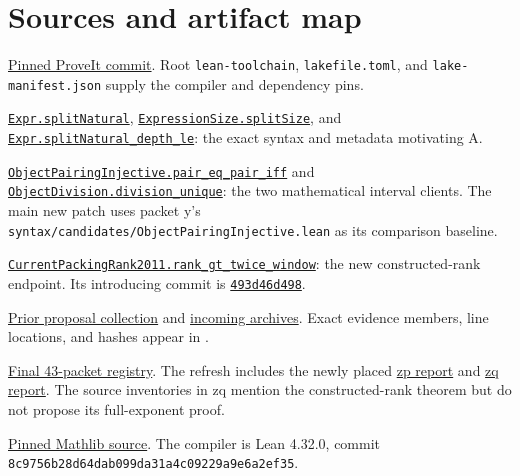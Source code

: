 \documentclass[11pt,letterpaper]{article}
\newcommand{\code}[1]{\texttt{\small #1}}
\newcommand{\source}[2]{\href{https://github.com/VladimirReshetnikov/ProveIt/blob/9d9d1123b39927d30363f1dcd53c23f0575c30ee/Computability/DiophantineConsistency/Lean/DiophantineConsistency/#1.lean}{\code{#1.#2}}}
\newcommand{\sourceNamed}[2]{\href{https://github.com/VladimirReshetnikov/ProveIt/blob/9d9d1123b39927d30363f1dcd53c23f0575c30ee/Computability/DiophantineConsistency/Lean/DiophantineConsistency/#1.lean}{\code{#2}}}
\begin{document}
\section*{Sources and artifact map}

\begingroup\raggedright
\begin{enumerate}[label={[\arabic*]}]
\item \href{https://github.com/VladimirReshetnikov/ProveIt/commit/9d9d1123b39927d30363f1dcd53c23f0575c30ee}{Pinned ProveIt commit}. Root \code{lean-toolchain}, \code{lakefile.toml}, and \code{lake-manifest.json} supply the compiler and dependency pins.
\item \sourceNamed{NaturalExpression}{Expr.splitNatural}, \source{ExpressionSize}{splitSize}, and \sourceNamed{RepresentationSize}{Expr.splitNatural\_depth\_le}: the exact syntax and metadata motivating A.
\item \source{ObjectPairingInjective}{pair\_eq\_pair\_iff} and \source{ObjectDivision}{division\_unique}: the two mathematical interval clients. The main new patch uses packet y's \code{syntax/candidates/ObjectPairingInjective.lean} as its comparison baseline.
\item \source{CurrentPackingRank2011}{rank\_gt\_twice\_window}: the new constructed-rank endpoint. Its introducing commit is \href{https://github.com/VladimirReshetnikov/ProveIt/commit/493d46d498af45840085ef8c170a9db6289157f9}{\code{493d46d498}}.
\item \href{https://github.com/VladimirReshetnikov/ProveIt/tree/9d9d1123b39927d30363f1dcd53c23f0575c30ee/Computability/DiophantineConsistency/research/lean-proof-simplification}{Prior proposal collection} and \href{https://github.com/VladimirReshetnikov/ProveIt/tree/9d9d1123b39927d30363f1dcd53c23f0575c30ee/docs/incoming}{incoming archives}. Exact evidence members, line locations, and hashes appear in .
\item \href{https://github.com/VladimirReshetnikov/ProveIt/blob/60fcb2a69b7f1fdd4c3592ea5f164223cad50abe/Computability/DiophantineConsistency/research/lean-proof-simplification/README.md}{Final 43-packet registry}. The refresh includes the newly placed \href{https://github.com/VladimirReshetnikov/ProveIt/blob/60fcb2a69b7f1fdd4c3592ea5f164223cad50abe/Computability/DiophantineConsistency/research/lean-proof-simplification/2026-10-26zp/report.tex}{zp report} and \href{https://github.com/VladimirReshetnikov/ProveIt/blob/60fcb2a69b7f1fdd4c3592ea5f164223cad50abe/Computability/DiophantineConsistency/research/lean-proof-simplification/2026-10-26zq/report.tex}{zq report}. The source inventories in zq mention the constructed-rank theorem but do not propose its full-exponent proof.
\item \href{https://github.com/leanprover-community/mathlib4/tree/81a5d257c8e410db227a6665ed08f64fea08e997}{Pinned Mathlib source}. The compiler is Lean 4.32.0, commit \code{8c9756b28d64dab099da31a4c09229a9e6a2ef35}.
\end{enumerate}
\endgroup
\end{document}
